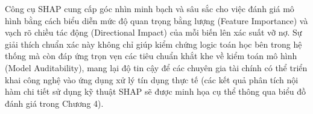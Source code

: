 Công cụ SHAP cung cấp góc nhìn minh bạch và sâu sắc cho việc đánh giá mô hình bằng cách biểu diễn mức độ quan trọng bằng lượng (Feature Importance) và vạch rõ chiều tác động (Directional Impact) của mỗi biến lên xác suất vỡ nợ. Sự giải thích chuẩn xác này không chỉ giúp kiểm chứng logic toán học bên trong hệ thống mà còn đáp ứng trọn vẹn các tiêu chuẩn khắt khe về kiểm toán mô hình (Model Auditability), mang lại độ tin cậy để các chuyên gia tài chính có thể triển khai công nghệ vào ứng dụng xử lý tín dụng thực tế (các kết quả phân tích nội hàm chi tiết sử dụng kỹ thuật SHAP sẽ được minh họa cụ thể thông qua biểu đồ đánh giá trong Chương 4).
